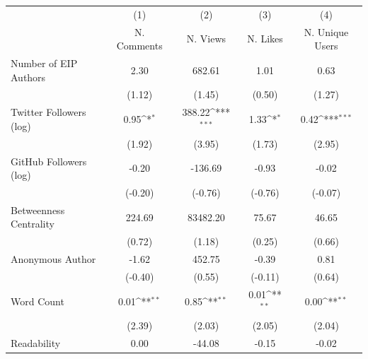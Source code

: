 {
\def\sym#1{\ifmmode^{#1}\else\(^{#1}\)\fi}
\begin{tabular}{l*{4}{c}}
\hline\hline
                                   &\multicolumn{1}{c}{(1)}&\multicolumn{1}{c}{(2)}&\multicolumn{1}{c}{(3)}&\multicolumn{1}{c}{(4)}\\
                                   &\multicolumn{1}{c}{N. Comments}&\multicolumn{1}{c}{N. Views}&\multicolumn{1}{c}{N. Likes}&\multicolumn{1}{c}{N. Unique Users}\\
\hline
Number of EIP Authors              &        2.30         &      682.61         &        1.01         &        0.63         \\
                                   &      (1.12)         &      (1.45)         &      (0.50)         &      (1.27)         \\
[1em]
Twitter Followers (log)            &        0.95\sym{*}  &      388.22\sym{***}&        1.33\sym{*}  &        0.42\sym{***}\\
                                   &      (1.92)         &      (3.95)         &      (1.73)         &      (2.95)         \\
[1em]
GitHub Followers (log)             &       -0.20         &     -136.69         &       -0.93         &       -0.02         \\
                                   &     (-0.20)         &     (-0.76)         &     (-0.76)         &     (-0.07)         \\
[1em]
Betweenness Centrality             &      224.69         &    83482.20         &       75.67         &       46.65         \\
                                   &      (0.72)         &      (1.18)         &      (0.25)         &      (0.66)         \\
[1em]
Anonymous Author                   &       -1.62         &      452.75         &       -0.39         &        0.81         \\
                                   &     (-0.40)         &      (0.55)         &     (-0.11)         &      (0.64)         \\
[1em]
Word Count                         &        0.01\sym{**} &        0.85\sym{**} &        0.01\sym{**} &        0.00\sym{**} \\
                                   &      (2.39)         &      (2.03)         &      (2.05)         &      (2.04)         \\
[1em]
Readability                        &        0.00         &      -44.08         &       -0.15         &       -0.02         \\

\end{tabular}}
